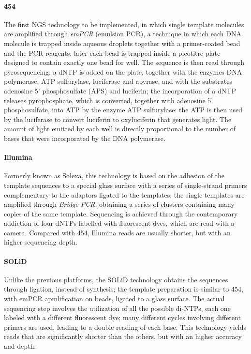 \paragraph{454} The first NGS technology to be implemented, in which single template molecules are amplified through \textit{emPCR} (emulsion PCR), a technique in which each DNA molecule is trapped inside aqueous droplets together with a primer-coated bead and the PCR reagents; later each bead is trapped inside a picotitre plate designed to contain exactly one bead for well. The sequence is then read through pyrosequencing: a dNTP is added on the plate, together with the enzymes DNA polymerase, ATP sulfurylase, luciferase and apyrase, and with the substrates adenosine 5'  phosphosulfate (APS) and luciferin; the incorporation of a dNTP releases pyrophosphate, which is converted, together with adenosine 5' phosphosulfate, into ATP by the enzyme ATP sulfurylase: the ATP is then used by the luciferase to convert luciferin to oxyluciferin that generates light. The amount of light emitted by each well is directly proportional to the number of bases that were incorporated by the DNA polymerase.

\paragraph{Illumina} Formerly known as Solexa, this technology is based on the adhesion of the template sequences to a special glass surface with a series of single-strand primers complementary to the adaptors ligated to the templates; the single templates are amplified through \textit{Bridge PCR}, obtaining a series of clusters containing many copies of the same template. Sequencing is achieved through the contemporary addiction of four dNTPs labelled with fluorescent dyes, which are read with a camera. Compared with 454, Illumina reads are usually shorter, but with an higher sequencing depth.

\paragraph{SOLiD} Unlike the previous platforms, the SOLiD technology obtains the sequences through ligation, instead of synthesis; the template preparation is similar to 454, with emPCR apmlification on beads, ligated to a glass surface. The actual sequencing step involves the utilization of all the possible di-NTPs, each one labeled with a different fluorescent dye; many different cycles involving different primers are used, leading to a double reading of each base. This technology yields reads that are significantly shorter than the others, but with an higher accuracy and depth.

